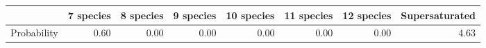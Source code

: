 \begin{table}[ht]
\centering
\begin{tabular}{rrrrrrrr}
  \hline
 & 7 species & 8 species & 9 species & 10 species & 11 species & 12 species & Supersaturated \\ 
  \hline
Probability & 0.60 & 0.00 & 0.00 & 0.00 & 0.00 & 0.00 & 4.63 \\ 
   \hline
\end{tabular}
\end{table}
